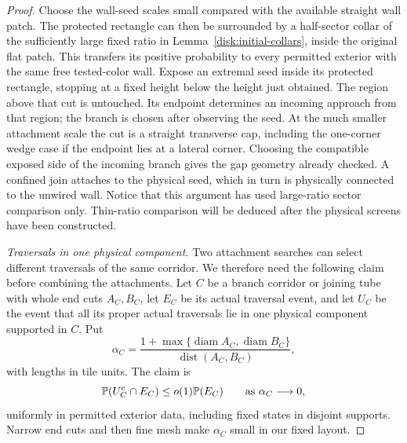 \begin{proof}
Choose the wall-seed scales small compared with the available straight
wall patch. The protected rectangle can then be surrounded by a
half-sector collar of the sufficiently large fixed ratio in
Lemma~\ref{disk:initial-collars}, inside the original flat patch. This
transfers its positive probability to every permitted exterior with
the same free tested-color wall. Expose an extremal seed inside its
protected rectangle, stopping at a fixed height below the height just
obtained. The region above that cut is untouched. Its endpoint
determines an incoming approach from that region; the branch is
chosen after observing the seed. At the much smaller attachment scale
the cut is a straight transverse cap, including the one-corner wedge
case if the endpoint lies at a lateral corner. Choosing the compatible
exposed side of the incoming branch gives the gap geometry already
checked. A confined join attaches to the physical seed, which in turn
is physically connected to the unwired wall. Notice that this argument
has used large-ratio sector comparison only. Thin-ratio comparison
will be deduced after the physical screens have been constructed.

\emph{Traversals in one physical component.}
Two attachment searches can select different traversals of the same
corridor. We therefore need the following claim before combining the
attachments. Let $C$ be a branch corridor or joining tube with whole
end cuts $A_C,B_C$, let $E_C$ be its actual traversal event, and let
$U_C$ be the event that all its proper actual traversals lie in one
physical component supported in $C$. Put
\[
 \alpha_C=
 \frac{1+\max\{\operatorname{diam} A_C,
                    \operatorname{diam} B_C\}}
      {\operatorname{dist}(A_C,B_C)},
\]
with lengths in tile units. The claim is
\[
 \mathbb P(U_C^c\cap E_C)\le o(1)\mathbb P(E_C)
 \qquad\text{as }\alpha_C\longrightarrow0,
\]
uniformly in permitted exterior data, including fixed states in
disjoint supports. Narrow end cuts and then fine mesh make
$\alpha_C$ small in our fixed layout.


\end{proof}
